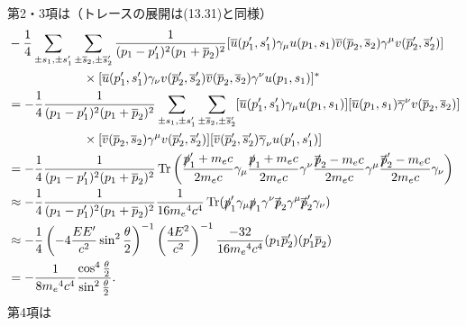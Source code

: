 第2・3項は（トレースの展開は(13.31)と同様）
\begin{align*}
  & -\frac{1}{4} \sum_{\pm s_1, \pm s_1'} \sum_{\pm \overline{s}_2, \pm\overline{s}_2'} \frac{1}{(p_1 - p_1')^2(p_1 +\overline{p}_2)^2} [\overline{u}(p_1', s_1') \gamma_\mu u(p_1, s_1) \overline{v}(\overline{p}_2, \overline{s}_2) \gamma^\mu v(\overline{p}_2', \overline{s}_2')] \\
  &\qquad\qquad\qquad \times [\overline{u}(p_1', s_1') \gamma_\nu v(\overline{p}_2', \overline{s}_2') \overline{v}(\overline{p}_2, \overline{s}_2) \gamma^\nu u(p_1, s_1)]^* \\
  & = -\frac{1}{4} \frac{1}{(p_1 - p_1')^2(p_1 +\overline{p}_2)^2} \sum_{\pm s_1, \pm s_1'} \sum_{\pm \overline{s}_2, \pm\overline{s}_2'} [\overline{u}(p_1', s_1') \gamma_\mu u(p_1, s_1)] [\overline{u}(p_1, s_1) \overline{\gamma}^\nu v(\overline{p}_2, \overline{s}_2)] \\
  &\qquad\qquad\qquad \times [\overline{v}(\overline{p}_2, \overline{s}_2) \gamma^\mu v(\overline{p}_2', \overline{s}_2')] [\overline{v}(\overline{p}_2', \overline{s}_2') \overline{\gamma}_\nu u(p_1', s_1')] \\
  & = -\frac{1}{4} \frac{1}{(p_1 - p_1')^2(p_1 +\overline{p}_2)^2} \operatorname{Tr} \left( \frac{\slashed{p}_1'+m_ec}{2m_ec} \gamma_\mu \frac{\slashed{p}_1+m_ec}{2m_ec} \gamma^\nu \frac{\slashed{\overline{p}}_2 - m_ec}{2m_ec} \gamma^\mu \frac{\slashed{\overline{p}}_2' - m_ec}{2m_ec} \gamma_\nu \right) \\
  & \approx -\frac{1}{4} \frac{1}{(p_1 - p_1')^2(p_1 +\overline{p}_2)^2} \frac{1}{16m_e{}^4c^4} \operatorname{Tr} (\slashed{p}_1' \gamma_\mu \slashed{p}_1 \gamma^\nu \slashed{\overline{p}}_2 \gamma^\mu \slashed{\overline{p}}_2' \gamma_\nu) \\
  & \approx -\frac{1}{4} \left(-4\frac{EE'}{c^2}\sin^2\frac{\theta}{2}\right)^{-1} \left(\frac{4E^2}{c^2} \right)^{-1} \frac{-32}{16m_e{}^4c^4} (p_1\overline{p}_2')(p_1'\overline{p}_2) \\
  & = -\frac{1}{8m_e{}^4c^4}\frac{\cos^4\frac{\theta}{2}}{\sin^2\frac{\theta}{2}}.
\end{align*}
第4項は
